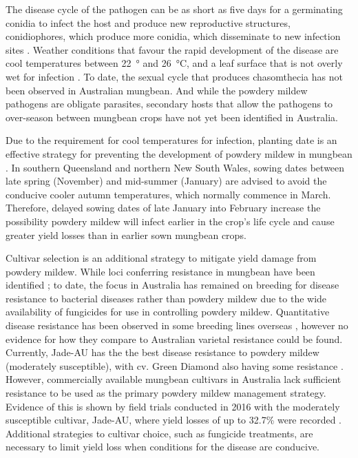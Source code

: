 \documentclass[agronomy,article,submit,moreauthors,pdftex]{mdpi}
\begin{document}
The disease cycle of the pathogen can be as short as five days for a germinating conidia to infect the host and produce new reproductive structures, conidiophores, which produce more conidia, which disseminate to new infection sites \citep{PerezGarcia2009, Sparks2017}.
Weather conditions that favour the rapid development of the disease are cool temperatures between 22~° and 26~°C, and a leaf surface that is not overly wet for infection \citep{Kelly2017a}.
To date, the sexual cycle that produces chasomthecia has not been observed in Australian mungbean.
And while the powdery mildew pathogens are obligate parasites, secondary hosts that allow the pathogens to over-season between mungbean crops have not yet been identified in Australia.

Due to the requirement for cool temperatures for infection, planting date is an effective strategy for preventing the development of powdery mildew in mungbean \citep{AMAplanting}.
In southern Queensland and northern New South Wales, sowing dates between late spring (November) and mid-summer (January) are advised to avoid the conducive cooler autumn temperatures, which normally commence in March.
Therefore, delayed sowing dates of late January into February increase the possibility powdery mildew will infect earlier in the crop's life cycle and cause greater yield losses than in earlier sown mungbean crops.

Cultivar selection is an additional strategy to mitigate yield damage from powdery mildew.
While loci conferring resistance in mungbean have been identified \citep{Humphry2003, Zhang2008}; to date, the focus in Australia has remained on breeding for disease resistance to bacterial diseases rather than powdery mildew due to the wide availability of fungicides for use in controlling powdery mildew.
Quantitative disease resistance has been observed in some breeding lines overseas \citep{Pandey2018, Chankaew2013}, however no evidence for how they compare to Australian varietal resistance could be found.
Currently, Jade-AU has the the best disease resistance to powdery mildew (moderately susceptible), with cv. Green Diamond also having some resistance \citep{AMAGuide}.
However, commercially available mungbean cultivars in Australia lack sufficient resistance to be used as the primary powdery mildew management strategy.
Evidence of this is shown by field trials conducted in 2016 with the moderately susceptible cultivar, Jade-AU, where yield losses of up to 32.7\% were recorded \citep{SueThompson2016}.
Additional strategies to cultivar choice, such as fungicide treatments, are necessary to limit yield loss when conditions for the disease are conducive.
\end{document}
